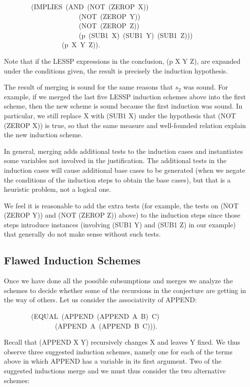 \documentclass[10pt]{book}
\newenvironment{pubasis}{\begin{flushleft}}{\end{flushleft}}
\begin{document}
\begin{pubasis}
~~~~~~~~(IMPLIES~(AND~(NOT~(ZEROP~X))\\
~~~~~~~~~~~~~~~~~~~~~~(NOT~(ZEROP~Y))\\
~~~~~~~~~~~~~~~~~~~~~~(NOT~(ZEROP~Z))\\
~~~~~~~~~~~~~~~~~~~~~~(p~(SUB1~X)~(SUB1~Y)~(SUB1~Z)))\\
~~~~~~~~~~~~~~~~~(p~X~Y~Z)).\\
\end{pubasis}
Note that if the LESSP expressions in the conclusion, (p X Y Z), are
expanded under the conditions given, the result is precisely the induction
hypothesis.

The result of merging is sound for the same reasons that $s_{2}$ was sound.
For example, if we merged the last five LESSP induction schemes above
into the first scheme,
then the new scheme is sound because the first induction was
sound.  In particular, we still replace X with (SUB1 X) under the hypothesis
that (NOT (ZEROP X)) is true, so that the same measure and well-founded
relation explain the new induction scheme.

In general, merging
adds additional tests to the induction cases
and instantiates some variables not involved in the justification.
The additional tests in the induction cases
will cause additional base cases to be generated (when we negate the
conditions of the induction steps to obtain the base cases), but
that is a heuristic problem, not a logical one.

We feel it is reasonable to add the extra tests (for example, the
tests on (NOT (ZEROP Y)) and (NOT (ZEROP Z)) above) to the induction steps
since those steps introduce instances (involving (SUB1 Y) and (SUB1 Z) in
our example) that generally do not make sense without such tests.

\subsection{Flawed Induction Schemes}
Once we have done all the possible subsumptions and merges we analyze the
schemes to decide whether some of the recursions in the conjecture
are getting in the way of others.  Let us consider the
associativity of APPEND:
\begin{pubasis}
~~~~~~~~(EQUAL~(APPEND~(APPEND~A~B)~C)\\
~~~~~~~~~~~~~~~(APPEND~A~(APPEND~B~C))).\\
\end{pubasis}
Recall that (APPEND X Y) recursively changes X and leaves
Y fixed.  We thus observe three suggested induction schemes,
namely one for each of the terms above in which APPEND has a variable
in its first argument.  Two of the suggested inductions merge
and we must thus consider the two alternative schemes:
\end{document}
